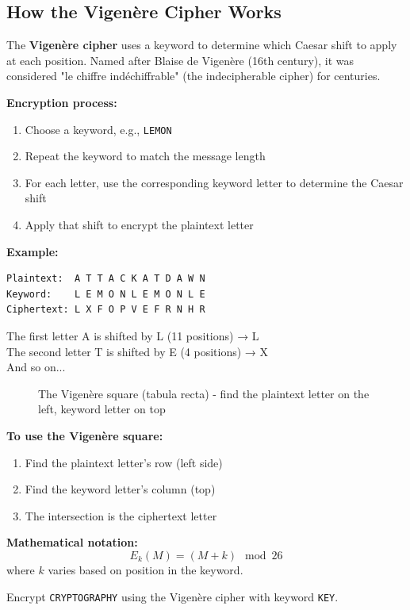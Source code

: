 \documentclass[11pt,a4paper]{report}
\begin{document}
\subsection{How the Vigenère Cipher Works}

The \textbf{Vigenère cipher} uses a keyword to determine which Caesar shift to apply at each position. Named after Blaise de Vigenère (16th century), it was considered "le chiffre indéchiffrable" (the indecipherable cipher) for centuries.

\textbf{Encryption process:}
\begin{enumerate}
\item Choose a keyword, e.g., \verb|LEMON|
\item Repeat the keyword to match the message length
\item For each letter, use the corresponding keyword letter to determine the Caesar shift
\item Apply that shift to encrypt the plaintext letter
\end{enumerate}

\textbf{Example:}
\begin{verbatim}
Plaintext:  A T T A C K A T D A W N
Keyword:    L E M O N L E M O N L E
Ciphertext: L X F O P V E F R N H R
\end{verbatim}

The first letter A is shifted by L (11 positions) → L \\
The second letter T is shifted by E (4 positions) → X \\
And so on...

\begin{figure}[h]
\caption{The Vigenère square (tabula recta) - find the plaintext letter on the left, keyword letter on top}
\end{figure}

\newpage
\textbf{To use the Vigenère square:}
\begin{enumerate}
\item Find the plaintext letter's row (left side)
\item Find the keyword letter's column (top)
\item The intersection is the ciphertext letter
\end{enumerate}

\textbf{Mathematical notation:}
\[ E_k(M) = (M + k) \mod 26 \]
where $k$ varies based on position in the keyword.

\begin{ex}
Encrypt \verb|CRYPTOGRAPHY| using the Vigenère cipher with keyword \verb|KEY|.
\end{ex}
\end{document}
